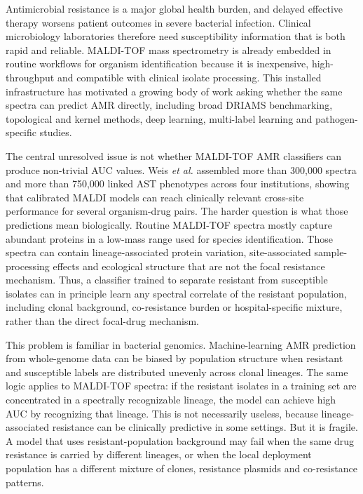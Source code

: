 \documentclass[11pt]{article}
\begin{document}
Antimicrobial resistance is a major global health burden, and delayed effective therapy worsens patient outcomes in severe bacterial infection\cite{amrCollaborators2022,kumar2006septicShock,seymour2017sepsis}. Clinical microbiology laboratories therefore need susceptibility information that is both rapid and reliable. MALDI-TOF mass spectrometry is already embedded in routine workflows for organism identification because it is inexpensive, high-throughput and compatible with clinical isolate processing\cite{croxatto2012maldiReview,vanbelkum2017maldiIssues,hou2019maldiStatus}. This installed infrastructure has motivated a growing body of work asking whether the same spectra can predict AMR directly, including broad DRIAMS benchmarking, topological and kernel methods, deep learning, multi-label learning and pathogen-specific studies\cite{weis2020topological,weis2020systematic,weis2022driams,wang2022vre,astudillo2024multilabel}.

The central unresolved issue is not whether MALDI-TOF AMR classifiers can produce non-trivial AUC values. Weis \textit{et al.} assembled more than 300,000 spectra and more than 750,000 linked AST phenotypes across four institutions, showing that calibrated MALDI models can reach clinically relevant cross-site performance for several organism-drug pairs\cite{weis2022driams,driamsdryad}. The harder question is what those predictions mean biologically. Routine MALDI-TOF spectra mostly capture abundant proteins in a low-mass range used for species identification. Those spectra can contain lineage-associated protein variation, site-associated sample-processing effects and ecological structure that are not the focal resistance mechanism. Thus, a classifier trained to separate resistant from susceptible isolates can in principle learn any spectral correlate of the resistant population, including clonal background, co-resistance burden or hospital-specific mixture, rather than the direct focal-drug mechanism.

This problem is familiar in bacterial genomics. Machine-learning AMR prediction from whole-genome data can be biased by population structure when resistant and susceptible labels are distributed unevenly across clonal lineages\cite{earle2016bacterialGwas,yu2025population}. The same logic applies to MALDI-TOF spectra: if the resistant isolates in a training set are concentrated in a spectrally recognizable lineage, the model can achieve high AUC by recognizing that lineage. This is not necessarily useless, because lineage-associated resistance can be clinically predictive in some settings. But it is fragile. A model that uses resistant-population background may fail when the same drug resistance is carried by different lineages, or when the local deployment population has a different mixture of clones, resistance plasmids and co-resistance patterns.
\end{document}
